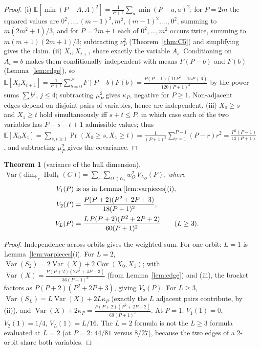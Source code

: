 \documentclass[10pt,journal,draftclsnofoot,onecolumn]{IEEEtran}
\newtheorem{theorem}{Theorem}[section]
\theoremstyle{definition}
\theoremstyle{remark}
\newcommand{\Fq}{\mathbb{F}_q}
\newcommand{\Hull}{\operatorname{Hull}}
\newcommand{\E}{\mathbb{E}}
\begin{document}
\begin{proof}
(i) \(\E[\min(P-A,A)^2] = \frac{1}{P+1}\sum_a \min(P-a,a)^2\); for
\(P = 2m\) the squared values are \(0^2,\dots,(m-1)^2,m^2,(m-1)^2,\dots,0^2\),
summing to \(m(2m^2+1)/3\), and for \(P=2m+1\) each of \(0^2,\dots,m^2\)
occurs twice, summing to \(m(m+1)(2m+1)/3\); subtracting \(\nu_P^2\)
(Theorem~\ref{thm:C5}) and simplifying gives the claim.
(ii) \(X_i, X_{i+1}\) share exactly the variable \(A_i\). Conditioning on
\(A_i = b\) makes them conditionally independent with means
\(F(P-b)\) and \(F(b)\) (Lemma~\ref{lem:edge}), so
\(\E[X_iX_{i+1}] = \frac{1}{P+1}\sum_{b=0}^P F(P-b)F(b)
= \frac{P(P-1)(11P^2+15P+6)}{120(P+1)^2}\) by the power sums
\(\sum b^j\), \(j \le 4\); subtracting \(\mu_P^2\) gives \(\kappa_P\),
negative for \(P \ge 1\). Non-adjacent edges depend on disjoint pairs of
variables, hence are independent.
(iii) \(X_0 \ge s\) and \(X_1 \ge t\) hold simultaneously iff
\(s + t \le P\), in which case each of the two variables has
\(P-s-t+1\) admissible values; thus
\(\E[X_0X_1] = \sum_{s,t\ge1} \Pr(X_0\ge s, X_1\ge t)
= \frac{1}{(P+1)^2} \sum_{r=1}^{P-1} (P-r) r^2
= \frac{P^2(P-1)}{12(P+1)}\), and subtracting \(\mu_P^2\) gives the
covariance.
\end{proof}

\begin{theorem}[variance of the hull dimension]\label{thm:C6}
\(\displaystyle
\operatorname{Var}\big(\dim_{\Fq} \Hull_k(C)\big)
= \sum_{s} \sum_{O \in \mathcal{O}_s} w_O^2\, V_{L_O}(P)\), where
\[
\begin{aligned}
V_1(P) &\text{ is as in Lemma~\ref{lem:varpieces}(i)},\\
V_2(P) &= \frac{P(P+2)(P^2+2P+3)}{18(P+1)^2},\\
V_L(P) &= \frac{L\, P(P+2)(P^2+2P+2)}{60(P+1)^2} \qquad (L \ge 3).
\end{aligned}
\]
\end{theorem}

\begin{proof}
Independence across orbits gives the weighted sum. For one orbit:
\(L=1\) is Lemma~\ref{lem:varpieces}(i). For \(L=2\),
\(\operatorname{Var}(S_2) = 2\operatorname{Var}(X) + 2\operatorname{Cov}(X_0,X_1)\);
with \(\operatorname{Var}(X) = \frac{P(P+2)(2P^2+4P+3)}{36(P+1)^2}\)
(from Lemma~\ref{lem:edge}) and (iii), the bracket factors as
\(P(P+2)(P^2+2P+3)\), giving \(V_2(P)\). For \(L \ge 3\),
\(\operatorname{Var}(S_L) = L\operatorname{Var}(X) + 2L\kappa_P\) (exactly
the \(L\) adjacent pairs contribute, by (ii)), and
\(\operatorname{Var}(X) + 2\kappa_P =
\frac{P(P+2)(P^2+2P+2)}{60(P+1)^2}\). At \(P=1\): \(V_1(1) = 0\),
\(V_2(1) = 1/4\), \(V_L(1) = L/16\). The \(L=2\) formula is not the
\(L \ge 3\) formula evaluated at \(L=2\) (at \(P=2\): \(44/81\) versus
\(8/27\)), because the two edges of a 2-orbit share both variables.
\end{proof}
\end{document}
